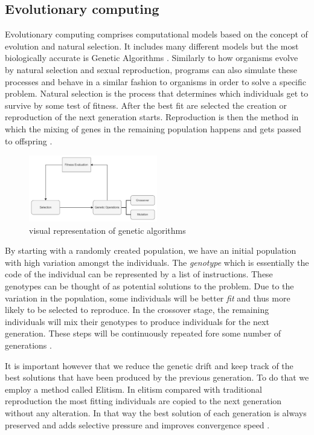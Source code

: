 \subsection{Evolutionary computing}
Evolutionary computing comprises computational models based on the concept of evolution and natural selection. 
It includes many different models but the most biologically accurate is Genetic Algorithms \cite{drugan2019reinforcement}. 
Similarly to how organisms evolve by natural selection and sexual reproduction, programs can also simulate these processes and behave in a similar fashion to organisms in order to solve a specific problem. 
Natural selection is the process that determines which individuals get to survive by some test of fitness. After the best fit are selected the creation or reproduction of the next generation starts. 
Reproduction is then the method in which the mixing of genes in the remaining population happens and gets passed to offspring \cite{holland1992genetic}.

\begin{figure}[H]
    \centering
    \includegraphics [width=0.5\textwidth]{Images/GA_graph.png}
    \caption{visual representation of genetic algorithms}
    \label{figGA}
\end{figure}

By starting with a randomly created population, we have an initial population with high variation amongst the individuals. 
The \textit{genotype} which is essentially the code of the individual can be represented by a list of instructions. 
These genotypes can be thought of as potential solutions to the problem. 
Due to the variation in the population, some individuals will be better \textit{fit} and thus more likely to be selected to reproduce. 
In the crossover stage, the remaining individuals will mix their genotypes to produce individuals for the next generation. 
These steps will be continuously repeated fore some number of generations \cite{forrest1996genetic}. 

It is important however that we reduce the genetic drift and keep track of the best solutions that have been produced by the previous generation. To do that we employ a method called Elitism. In elitism compared with traditional reproduction the most fitting individuals are copied to the next generation without any alteration. In that way the best solution of each generation is always preserved and adds selective pressure and improves convergence speed \cite{du2018elitism}.


